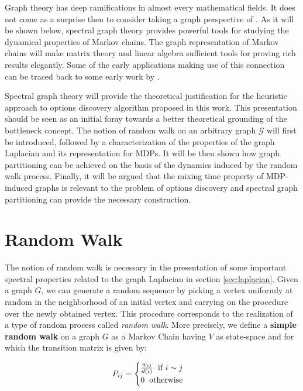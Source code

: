 
Graph theory has deep ramifications in almost every mathematical fields. It does not come as a surprise then to consider taking a graph perspective of \mdps. As it will be shown below, spectral graph theory provides powerful
tools for studying the dynamical properties of Markov chains. The graph
representation of Markov chains will make matrix theory and linear
algebra sufficient tools for proving rich results elegantly. Some of the early
applications making use of this connection can be traced back to some early work by \cite{SimonAndo1961, DonathHoffman1973, Fiedler1973}.

Spectral graph theory will provide the theoretical justification for the heuristic approach
to options discovery algorithm proposed in this work. This presentation should be seen
as an initial foray towards a better theoretical grounding of the bottleneck concept. The notion of random walk on an arbitrary graph
$\mathcal{G}$ will first be introduced, followed by a characterization of the properties of the graph Laplacian and its representation for MDPs. It will be then shown how
graph partitioning can be achieved on the basis of the dynamics induced by the random
walk process. Finally, it will be argued that the mixing time property of MDP-induced
graphs is relevant to the problem of options discovery and spectral graph partitioning
can provide the necessary construction. 

\section{Random Walk}
\label{sec:random-walk}
The notion of random walk is necessary in the presentation of some important spectral
properties related to the graph Laplacian in section \ref{sec:laplacian}. Given a graph
$G$, we can generate a random sequence by picking a vertex uniformly at
random in the neighborhood of an initial vertex and carrying on the procedure over the
newly obtained vertex. This procedure corresponds to the realization of a type of
random process called \textit{random walk}. More precisely, we define a \textbf{simple
random walk} on a graph $G$ as a Markov Chain having $V$ as state-space and for
which the transition matrix is given by:

\begin{equation}
P_{ij} = \begin{cases} 
\frac{w_{ij}}{d(i)} \hspace{2mm} \mbox{if $i \sim j$} \\
0 \hspace{2mm} \mbox{otherwise}
\end{cases}
\end{equation}

